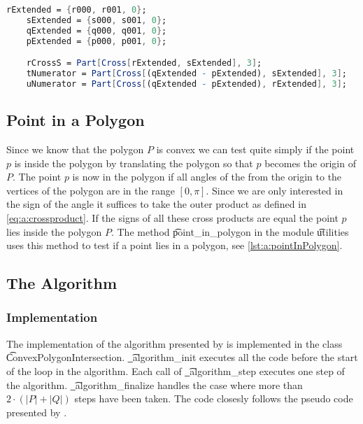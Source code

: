 	\begin{lstlisting}[language=Mathematica, label={lst:a:lineSegmentIntersectionMat}, caption={Mathematica code used to compute the value of \t{r_cross_s}, \t{u_numerator} and \t{t_numerator}.}]
	rExtended = {r000, r001, 0};
	sExtended = {s000, s001, 0};
	qExtended = {q000, q001, 0};
	pExtended = {p000, p001, 0};

	rCrossS = Part[Cross[rExtended, sExtended], 3];
	tNumerator = Part[Cross[(qExtended - pExtended), sExtended], 3];
	uNumerator = Part[Cross[(qExtended - pExtended), rExtended], 3];
	\end{lstlisting}

	

\subsection*{Point in a Polygon}
	Since we know that the polygon $P$ is convex we can test quite simply if the point $p$ is inside the polygon by translating the polygon so that $p$ becomes the origin of $P$. The point $p$ is now in the polygon if all angles of the from the origin to the vertices of the polygon are in the range $[0, \pi]$. Since we are only interested in the sign of the angle it suffices to take the outer product as defined in \autoref{eq:a:crossproduct}. If the signs of all these cross products are equal the point $p$ lies inside the polygon $P$. \cite{wolfram} The method \t{point_in_polygon} in the module \t{utilities} uses this method to test if a point lies in a polygon, see \autoref{lst:a:pointInPolygon}.

		


\subsection*{The Algorithm}


	\subsubsection*{Implementation}
	The implementation of the algorithm presented by \textcite{o1982new} is implemented in the class \t{ConvexPolygonIntersection}. \t{_algorithm_init} executes all the code before the start of the loop in the algorithm. Each call of \t{_algorithm_step} executes one step of the algorithm. \t{_algorithm_finalize} handles the case where more than $2 \cdot (|P| + |Q|)$ steps have been taken. The code closesly follows the pseudo code presented by \citeauthor{o1982new}.

